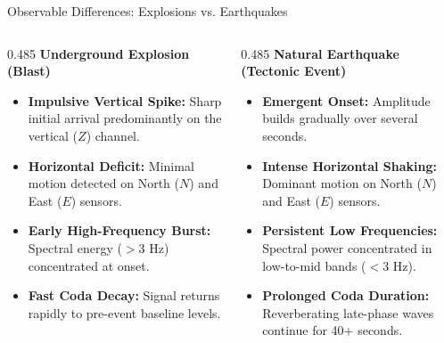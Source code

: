 \documentclass[aspectratio=169,11pt]{beamer}
\begin{document}
\begin{frame}{Observable Differences: Explosions vs. Earthquakes}
  \par
  \vspace*{0.28cm}

  \begin{columns}[T,onlytextwidth]
    \begin{column}{0.485\textwidth}
      \textbf{\color{blastred} Underground Explosion (Blast)}
      \vspace*{0.12cm}
      \begin{itemize}\setlength{\itemsep}{0.40em}\footnotesize
        \item \textbf{Impulsive Vertical Spike:} Sharp initial arrival predominantly on the vertical ($Z$) channel.
        \item \textbf{Horizontal Deficit:} Minimal motion detected on North ($N$) and East ($E$) sensors.
        \item \textbf{Early High-Frequency Burst:} Spectral energy ($>3\text{ Hz}$) concentrated at onset.
        \item \textbf{Fast Coda Decay:} Signal returns rapidly to pre-event baseline levels.
      \end{itemize}
    \end{column}
    \hfill
    \begin{column}{0.485\textwidth}
      \textbf{\color{quakeblue} Natural Earthquake (Tectonic Event)}
      \vspace*{0.12cm}
      \begin{itemize}\setlength{\itemsep}{0.40em}\footnotesize
        \item \textbf{Emergent Onset:} Amplitude builds gradually over several seconds.
        \item \textbf{Intense Horizontal Shaking:} Dominant motion on North ($N$) and East ($E$) sensors.
        \item \textbf{Persistent Low Frequencies:} Spectral power concentrated in low-to-mid bands ($<3\text{ Hz}$).
        \item \textbf{Prolonged Coda Duration:} Reverberating late-phase waves continue for 40+ seconds.
      \end{itemize}
    \end{column}
  \end{columns}

  \vspace*{0.32cm}
  \centering
\end{frame}
\end{document}
